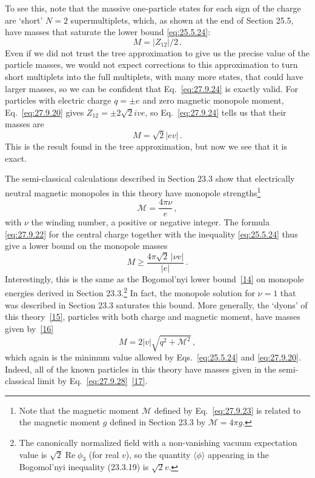 To see this, note that the massive one-particle states for each sign of the
charge are `short' \(N=2\) supermultiplets, which, as shown at the end of
Section 25.5, have masses that saturate the lower bound \eqref{eq:25.5.24}:
\begin{equation}
  M=|Z_{12}|/2\,.
  \tag{27.9.24}\label{eq:27.9.24}
\end{equation}
Even if we did not trust the tree approximation to give us the precise value
of the particle masses, we would not expect corrections to this approximation
to turn short multiplets into the full multiplets, with many more states, that
could have larger masses, so we can be confident that Eq.~\eqref{eq:27.9.24}
is exactly valid. For particles with electric charge \(q=\mathord{\pm}e\) and
zero magnetic monopole moment, Eq.~\eqref{eq:27.9.20} gives
\(Z_{12}=\mathord{\pm}2\sqrt{2}ive\), so Eq.~\eqref{eq:27.9.24} tells us that
their masses are
\begin{equation}
  M=\sqrt{2}|ev|\,.
  \tag{27.9.25}\label{eq:27.9.25}
\end{equation}
This is the result found in the tree approximation, but now we see that it is
exact.

The semi-classical calculations described in Section 23.3 show that
electrically neutral magnetic monopoles in this theory have monopole
strengths\footnote{Note that the magnetic moment \(\mathcal{M}\) defined by
Eq.~\eqref{eq:27.9.23} is related to the magnetic moment \(g\) defined in
Section 23.3 by \(\mathcal{M}=4\pi g\).}
\begin{equation}
  \mathcal{M}=\frac{4\pi\nu}{e}\,,
  \tag{27.9.26}\label{eq:27.9.26}
\end{equation}
with \(\nu\) the winding number, a positive or negative integer. The formula
\eqref{eq:27.9.22} for the central charge together with the inequality
\eqref{eq:25.5.24} thus give a lower bound on the monopole masses
\begin{equation}
  M\geq\frac{4\pi\sqrt{2}\,|\nu v|}{|e|}\,.
  \tag{27.9.27}\label{eq:27.9.27}
\end{equation}
Interestingly, this is the same as the Bogomol'nyi lower
bound~\hyperref[ch27-ref-14]{[14]} on monopole energies derived in Section
23.3.\footnote{The canonically normalized field with a non-vanishing vacuum
expectation value is \(\sqrt{2}\operatorname{Re}\phi_3\) (for real \(v\)), so
the quantity \(\langle\phi\rangle\) appearing in the Bogomol'nyi inequality
(23.3.19) is \(\sqrt{2}v\).} In fact, the monopole solution for \(\nu=1\)
that was described in Section 23.3 saturates this bound. More generally, the
`dyons' of this theory~\hyperref[ch27-ref-15]{[15]}, particles with both
charge and magnetic moment, have masses given
by~\hyperref[ch27-ref-16]{[16]}
\begin{equation}
  M=2|v|\sqrt{q^2+\mathcal{M}^2}\,,
  \tag{27.9.28}\label{eq:27.9.28}
\end{equation}
which again is the minimum value allowed by Eqs.~\eqref{eq:25.5.24} and
\eqref{eq:27.9.20}. Indeed, all of the known particles in this theory have
masses given in the semi-classical limit by
Eq.~\eqref{eq:27.9.28}~\hyperref[ch27-ref-17]{[17]}.

